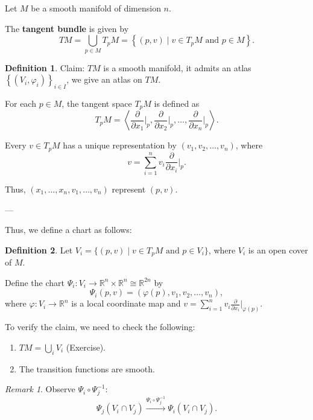 \documentclass[11pt]{article}
\theoremstyle{definition}
\newtheorem{definition}{Definition}[section]
\theoremstyle{remark}
\newtheorem{remark}{Remark}[section]
\begin{document}
Let $M$ be a smooth manifold of dimension $n$.

The \textbf{tangent bundle} is given by
\[
TM = \bigcup_{p \in M} T_p M = \left\{ (p, v) \mid v \in T_p M \text{ and } p \in M \right\}.
\]

\begin{definition}\label{def:tangent_bundle_atlas}
Claim: $TM$ is a smooth manifold, it admits an atlas $\left\{ (V_i, \varphi_i) \right\}_{i \in I}$, we give an atlas on $TM$.
\end{definition}

For each $p \in M$, the tangent space $T_p M$ is defined as
\[
T_p M = \left\langle \frac{\partial}{\partial x_1}\bigg|_{p}, \frac{\partial}{\partial x_2}\bigg|_{p}, \dots, \frac{\partial}{\partial x_n}\bigg|_{p} \right\rangle.
\]

Every $v \in T_p M$ has a unique representation by $(v_1, v_2, \dots, v_n)$, where
\[
v = \sum_{i=1}^n v_i \frac{\partial}{\partial x_i}\bigg|_{p}.
\]

Thus, $(x_1, \dots, x_n, v_1, \dots, v_n)$ represent $(p, v)$.

---

Thus, we define a chart as follows:

\begin{definition}\label{def:tangent_bundle_chart}
Let $V_i = \{(p,v) \mid v \in T_p M \text{ and } p \in V_i\}$, where $V_i$ is an open cover of $M$.

Define the chart $\Psi_i \colon V_i \to \mathbb{R}^n \times \mathbb{R}^n \cong \mathbb{R}^{2n}$ by
\[
\Psi_i(p,v) = (\varphi(p), v_1, v_2, \dots, v_n),
\]
where $\varphi \colon V_i \to \mathbb{R}^n$ is a local coordinate map and $v = \sum_{i=1}^n v_i \frac{\partial}{\partial x_i}\Big|_{\varphi(p)}$.

To verify the claim, we need to check the following:

\begin{enumerate}
    \item $TM = \bigcup_i V_i$ (Exercise).
    \item The transition functions are smooth.
\end{enumerate}
\end{definition}

\begin{remark}\label{rem:transition}
Observe $\Psi_i \circ \Psi_j^{-1}$:
\[
\Psi_j(V_i \cap V_j) \xrightarrow{\Psi_i \circ \Psi_j^{-1}} \Psi_i(V_i \cap V_j).
\]
\end{remark}
\end{document}
